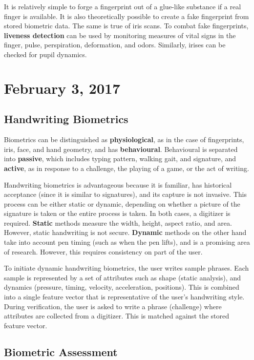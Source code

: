 \documentclass[11pt]{article}
\theoremstyle{plain} %
\theoremstyle{definition}
\theoremstyle{example}
\theoremstyle{remark}
\begin{document}
It is relatively simple to forge a fingerprint out of a glue-like substance if a real finger is available. It is also theoretically possible to create a fake fingerprint from stored biometric data. The same is true of iris scans. To combat fake fingerprints, \textbf{liveness detection} can be used by monitoring measures of vital signs in the finger, pulse, perspiration, deformation, and odors. Similarly, irises can be checked for pupil dynamics. 

\section{February 3, 2017}
\subsection{Handwriting Biometrics}

Biometrics can be distinguished as \textbf{physiological}, as in the case of fingerprints, iris, face, and hand geometry, and has \textbf{behavioural}. Behavioural is separated into \textbf{passive}, which includes typing pattern, walking gait, and signature, and \textbf{active}, as in response to a challenge, the playing of a game, or the act of writing.
 
Handwriting biometrics is advantageous because it is familiar, has historical acceptance (since it is similar to signatures), and its capture is not invasive. This process can be either static or dynamic, depending on whether a picture of the signature is taken or the entire process is taken. In both cases, a digitizer is required. \textbf{Static} methods measure the width, height, aspect ratio, and area. However, static handwriting is not secure. \textbf{Dynamic} methods on the other hand take into account pen timing (such as when the pen lifts), and is a promising area of research. However, this requires consistency on part of the user. 

To initiate dynamic handwriting biometrics, the user writes sample phrases. Each sample is represented by a set of attributes such as shape (static analysis), and dynamics (pressure, timing, velocity, acceleration, positions). This is combined into a single feature vector that is representative of the user's handwriting style. During verification, the user is asked to write a phrase (challenge) where attributes are collected from a digitizer. This is matched against the stored feature vector. 

\subsection{Biometric Assessment}
\end{document}
